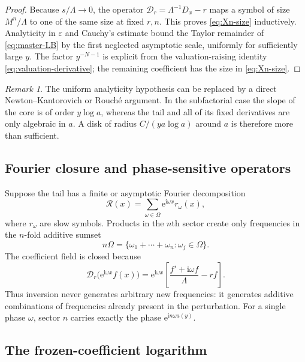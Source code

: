 \documentclass[11pt,a4paper]{article}
\numberwithin{equation}{section}
\theoremstyle{definition}
\theoremstyle{remark}
\newtheorem{remark}[theorem]{Remark}
\newcommand{\e}{\mathrm e}
\newcommand{\ii}{\mathrm i}
\newcommand{\Lam}{\Lambda}
\newcommand{\Res}{\mathcal R}
\begin{document}
\begin{proof}
Because $s/\Lam\to0$, the operator
$\mathscr D_r=\Lam^{-1}D_x-r$ maps a symbol of size $M^n/\Lam$ to one of the
same size at fixed $r,n$.  This proves \eqref{eq:Xn-size} inductively.
Analyticity in $\varepsilon$ and Cauchy's estimate bound the Taylor remainder
of \eqref{eq:master-LB} by the first neglected asymptotic scale, uniformly
for sufficiently large $y$.  The factor $y^{-N-1}$ is explicit from the
valuation-raising identity \eqref{eq:valuation-derivative}; the remaining
coefficient has the size in \eqref{eq:Xn-size}.
\end{proof}

\begin{remark}
The uniform analyticity hypothesis can be replaced by a direct
Newton--Kantorovich or Rouch\'e argument.  In the subfactorial case the slope
of the core is of order $y\log a$, whereas the tail and all of its fixed
derivatives are only algebraic in $a$.  A disk of radius
$C/(ya\log a)$ around $a$ is therefore more than sufficient.
\end{remark}

\subsection{Fourier closure and phase-sensitive operators}

Suppose the tail has a finite or asymptotic Fourier decomposition
\begin{equation}\label{eq:R-Fourier}
 \Res(x)=\sum_{\omega\in\Omega}\e^{\ii\omega x}r_\omega(x),
\end{equation}
where $r_\omega$ are slow symbols.  Products in the $n$th sector create only
frequencies in the $n$-fold additive sumset
\begin{equation}\label{eq:sumset}
 n\Omega=\{\omega_1+\cdots+\omega_n:\omega_j\in\Omega\}.
\end{equation}
The coefficient field is closed because
\begin{equation}\label{eq:phase-operator-general}
 \mathscr D_r\bigl(\e^{\ii\omega x}f(x)\bigr)
 =\e^{\ii\omega x}
 \left[\frac{f'+\ii\omega f}{\Lam}-rf\right].
\end{equation}
Thus inversion never generates arbitrary new frequencies: it generates
additive combinations of frequencies already present in the perturbation.
For a single phase $\omega$, sector $n$ carries exactly the phase
$\e^{\ii n\omega a(y)}$.

\subsection{The frozen-coefficient logarithm}
\end{document}

